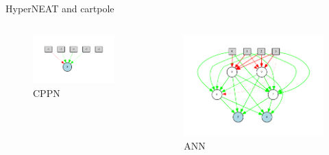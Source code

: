 \documentclass{beamer}
\begin{document}
\begin{frame}{HyperNEAT and cartpole}
    \begin{columns}
        \begin{column}{0.5\textwidth}
            \begin{figure}[c]
                \includegraphics[width=\textwidth]{pdf/hyperneat_pole_balancing_cppn.pdf}
                \caption{CPPN}
            \end{figure}\end{column}
        \begin{column}{0.5\textwidth}
            \begin{figure}[c]
                \includegraphics[width=\textwidth]{pdf/hyperneat_pole_balancing_winner.pdf}
                \caption{ANN}
            \end{figure}
        \end{column}
    \end{columns}
\end{frame}
\end{document}
